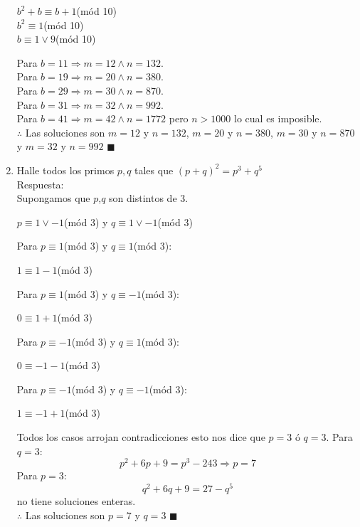 \documentclass{book}
\begin{document}
\begin{enumerate}
				\begin{center}
				$b^2 + b \equiv b + 1$(mód 10)\\ 
				$b^2 \equiv 1$(mód 10)\\   
 				$b \equiv 1 \vee 9$(mód 10)\\  
				\end{center}	
Para $b= 11 \Rightarrow m = 12 \wedge n = 132$. \\
Para $b = 19 \Rightarrow m = 20 \wedge n = 380$. \\
Para $b = 29 \Rightarrow m = 30 \wedge n = 870$. \\
Para $b = 31 \Rightarrow m = 32 \wedge n = 992$. \\
Para $ b = 41 \Rightarrow m= 42 \wedge n = 1772$ pero $n > 1000$ lo cual es imposible. \\
$\therefore$ Las soluciones son $m= 12$ y $n= 132$, $m= 20$ y $n= 380$, $m= 30$ y $n= 870$ y $m= 32$ y $n= 992$ $\blacksquare$\\
			\item Halle todos los primos $p,q$ tales que ${(p+q)}^2 = p^3+q^5$ \\
			Respuesta:\\
			Supongamos que $p$,$q$ son distintos de 3. 
				\begin{center}
					$p\equiv 1 \vee -1$(mód 3)  y $q\equiv 1 \vee -1$(mód 3)
				\end{center}
Para $p\equiv 1$(mód 3)  y $q\equiv 1 $(mód 3):
				\begin{center}
					$1\equiv 1-1$(mód 3)
				\end{center}
Para $p\equiv 1 $(mód 3)  y $q\equiv -1 $(mód 3):
				\begin{center}
					$0\equiv 1+1$(mód 3)
				\end{center}
Para $p\equiv -1 $(mód 3)  y $q\equiv 1 $(mód 3):
				\begin{center}
					$0\equiv -1-1$(mód 3)
				\end{center}
Para $p\equiv -1 $(mód 3)  y $q\equiv -1 $(mód 3):
				\begin{center}
					$1\equiv -1+1$(mód 3)
				\end{center}
Todos los casos arrojan contradicciones esto nos dice que $p=3$ ó  $q=3$.
Para $q=3$:
$$p^2+6p+9=p^3-243 \Rightarrow p=7$$
Para $p=3$:
$$q^2+6q+9=27-q^5 $$  no tiene soluciones enteras.\\
$\therefore$ Las soluciones son $p=7$ y $q=3$ $\blacksquare$\\


\end{enumerate}
\end{document}

